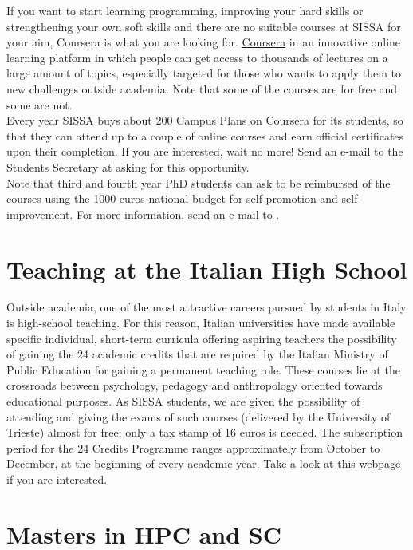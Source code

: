 \documentclass{sissavademecum}
\begin{document}
If you want to start learning programming, improving your hard skills or strengthening your own soft skills and there are no suitable courses at SISSA for your aim, Coursera is what you are looking for. \href{https://www.coursera.org/}{Coursera} in an innovative online learning platform in which people can get access to thousands of lectures on a large amount of topics, especially targeted for those who wants to apply them to new challenges outside academia. Note that some of the courses are for free and some are not. \\
Every year SISSA buys about 200 Campus Plans on Coursera for its students, so that they can attend up to a couple of online courses and earn official certificates upon their completion. If you are interested, wait no more! Send an e-mail to the Students Secretary at  asking for this opportunity. \\
Note that third and fourth year PhD students can ask to be reimbursed of the courses using the 1000 euros national budget for self-promotion and self-improvement. For more information, send an e-mail to .


\section{Teaching at the Italian High School}

Outside academia, one of the most attractive careers pursued by students in Italy is high-school teaching. For this reason, Italian universities have made available specific individual, short-term curricula offering aspiring teachers the possibility of gaining the 24 academic credits that are required by the Italian Ministry of Public Education for gaining a permanent teaching role. These courses lie at the crossroads between psychology, pedagogy and anthropology oriented towards educational purposes. As SISSA students, we are given the possibility of attending and giving the exams of such courses (delivered by the University of Trieste) almost for free: only a tax stamp of 16 euros is needed. The subscription period for the 24 Credits Programme ranges approximately from October to December, at the beginning of every academic year. Take a look at \href{https://www.units.it/offerta-formativa/percorso-formativo-24-cfu}{this webpage} if you are interested.


\section{Masters in HPC and SC}
\end{document}

